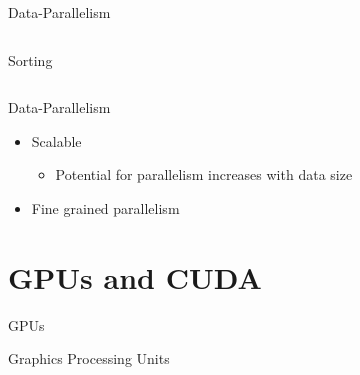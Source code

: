 \documentclass[xcolor=dvipsnames]{beamer}
\begin{document}
\begin{frame}{Data-Parallelism}
\begin{columns}
\begin{column}{.48\textwidth}
  Sorting

  \end{column}
  
  \end{columns}

\end{frame}


\begin{frame}{Data-Parallelism}

  \begin{itemize} 
    \item Scalable
      \begin{itemize} 
        \item Potential for parallelism increases with data size 
      \end{itemize}
    \item Fine grained parallelism 
  \end{itemize} 

\end{frame}

%
\section{GPUs and CUDA}

\begin{frame}{GPUs} 
  \begin{center}
  {\Large Graphics Processing Units}
  \end{center}
\end{frame} 
\end{document}
